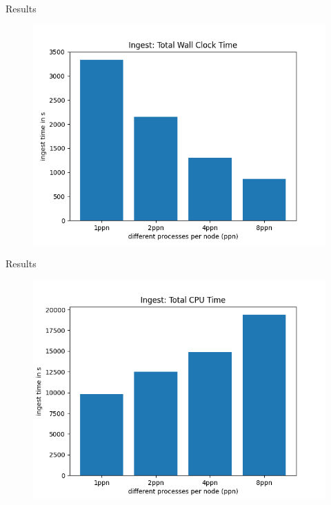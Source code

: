 \documentclass[compress,aspectratio=169]{beamer}
\begin{document}
  \begin{frame}{Results}
    \begin{figure}
      \includegraphics[height=0.9\textheight]{./analysis/wallclocktime.png}
    \end{figure}
  \end{frame}
  \begin{frame}{Results}
    \begin{figure}
      \includegraphics[height=0.9\textheight]{./analysis/cputime.png}
    \end{figure}
  \end{frame}
\end{document}
